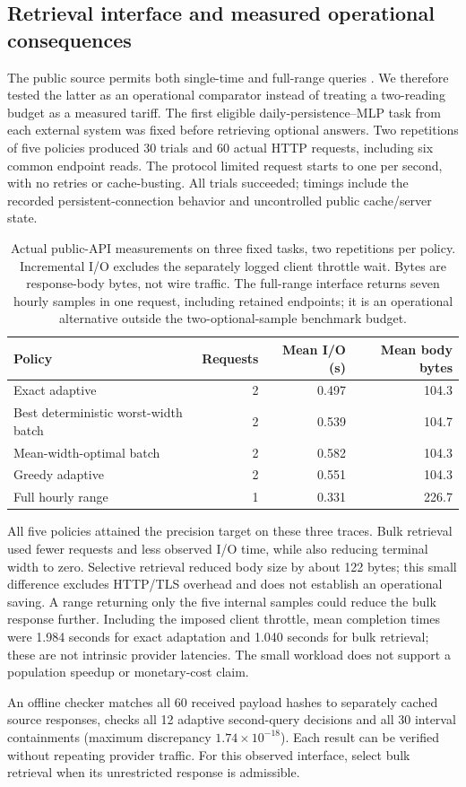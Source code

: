 \subsection{Retrieval interface and measured operational consequences}
\label{sec:actual-api}
The public source permits both single-time and full-range queries
\citep{hpmapi,hpmcode}. We therefore tested the latter as an operational
comparator instead of treating a two-reading budget as a measured tariff.
The first eligible daily-persistence--MLP task from each external system
was fixed before retrieving optional answers. Two repetitions of five
policies produced 30 trials and 60 actual HTTP requests, including six
common endpoint reads. The protocol limited request starts to one per
second, with no retries or cache-busting. All trials succeeded; timings
include the recorded persistent-connection behavior and uncontrolled
public cache/server state.

\begin{table}[htbp]\centering\small
\caption{Actual public-API measurements on three fixed tasks, two
repetitions per policy. Incremental I/O excludes the separately logged
client throttle wait. Bytes are response-body bytes, not wire traffic.
The full-range interface returns seven hourly samples in one request,
including retained endpoints; it is an operational alternative outside
the two-optional-sample benchmark budget.}\label{tab:actual-api}
\begin{tabular}{lrrr}\toprule
Policy & Requests & Mean I/O (s) & Mean body bytes\\\midrule
Exact adaptive & 2 & 0.497 & 104.3\\
Best deterministic worst-width batch & 2 & 0.539 & 104.7\\
Mean-width-optimal batch & 2 & 0.582 & 104.3\\
Greedy adaptive & 2 & 0.551 & 104.3\\
Full hourly range & 1 & 0.331 & 226.7\\\bottomrule
\end{tabular}\end{table}

All five policies attained the precision target on these three traces.
Bulk retrieval used fewer requests and less observed I/O time, while
also reducing terminal width to zero. Selective retrieval reduced body
size by about 122 bytes; this small difference excludes HTTP/TLS overhead
and does not establish an operational saving. A range returning only the
five internal samples could reduce the bulk response further. Including
the imposed client throttle, mean completion times were 1.984 seconds
for exact adaptation and 1.040 seconds for bulk retrieval; these are not
intrinsic provider latencies. The small workload does not support a
population speedup or monetary-cost claim.

An offline checker matches all 60 received payload hashes to separately
cached source responses, checks all 12 adaptive second-query decisions
and all 30 interval containments (maximum discrepancy
$1.74\times10^{-18}$). Each result can be verified without repeating
provider traffic. For this observed interface, select bulk retrieval when
its unrestricted response is admissible.
\FloatBarrier
